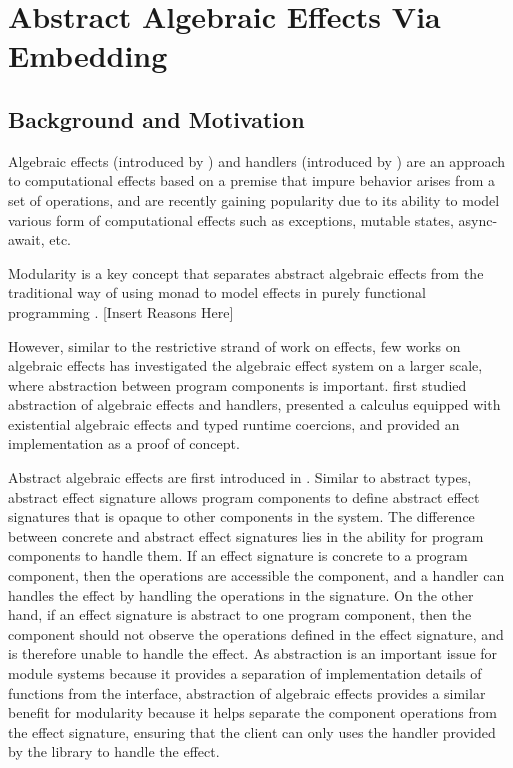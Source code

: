 
\chapter{Abstract Algebraic Effects Via Embedding}

\section{Background and Motivation}

Algebraic effects (introduced by \citet{plotkin02}) and handlers (introduced by \citet{plotkin09}) are an approach to computational effects based on a premise that impure behavior arises from a set of operations, and are recently gaining popularity due to its ability to model various form of computational effects such as exceptions, mutable states, async-await, etc.

Modularity is a key concept that separates abstract algebraic effects from the traditional way of using monad to model effects in purely functional programming \cite{schrijvers19}. [Insert Reasons Here] 

However, similar to the restrictive strand of work on effects, few works on algebraic effects has investigated the algebraic effect system on a larger scale, where abstraction between program components is important. \citet{biernacki19} first studied abstraction of algebraic effects and handlers, presented a calculus equipped with existential algebraic effects and typed runtime coercions, and provided an implementation as a proof of concept. 


Abstract algebraic effects are first introduced in \cite{biernacki19}. Similar to abstract types, abstract effect signature allows program components to define abstract effect signatures that is opaque to other components in the system. The difference between concrete and abstract effect signatures lies in the ability for program components to handle them. If an effect signature is concrete to a program component, then the operations are accessible the component, and a handler can handles the effect by handling the operations in the signature. On the other hand, if an effect signature is abstract to one program component, then the component should not observe the operations defined in the effect signature, and is therefore unable to handle the effect. As abstraction is an important issue for module systems because it provides a separation of implementation details of functions from the interface, abstraction of algebraic effects provides a similar benefit for modularity because it helps separate the component operations from the effect signature, ensuring that the client can only uses the handler provided by the library to handle the effect.

